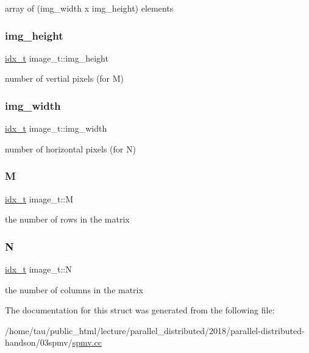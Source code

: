 array of (img\+\_\+width x img\+\_\+height) elements \mbox{\label{structimage__t_a37efb1b675fc28e5a131dca263fd2833}} 
\subsubsection{\texorpdfstring{img\+\_\+height}{img\_height}}
{\footnotesize\ttfamily \hyperlink{spmv_8cc_a8e93478a00e685bea5e6a3f617bf03a3}{idx\+\_\+t} image\+\_\+t\+::img\+\_\+height}

number of vertial pixels (for M) \mbox{\label{structimage__t_ae5f65c72e35caf8e730fe7962e732b0f}} 
\subsubsection{\texorpdfstring{img\+\_\+width}{img\_width}}
{\footnotesize\ttfamily \hyperlink{spmv_8cc_a8e93478a00e685bea5e6a3f617bf03a3}{idx\+\_\+t} image\+\_\+t\+::img\+\_\+width}

number of horizontal pixels (for N) \mbox{\label{structimage__t_a9ee57eb792a8c6bd1cd79efa329c728d}} 
\subsubsection{\texorpdfstring{M}{M}}
{\footnotesize\ttfamily \hyperlink{spmv_8cc_a8e93478a00e685bea5e6a3f617bf03a3}{idx\+\_\+t} image\+\_\+t\+::M}

the number of rows in the matrix \mbox{\label{structimage__t_ac6fdcfae13f4b5eccac7e9ef12502d64}} 
\subsubsection{\texorpdfstring{N}{N}}
{\footnotesize\ttfamily \hyperlink{spmv_8cc_a8e93478a00e685bea5e6a3f617bf03a3}{idx\+\_\+t} image\+\_\+t\+::N}

the number of columns in the matrix 

The documentation for this struct was generated from the following file\+:\begin{DoxyCompactItemize}
\item 
/home/tau/public\+\_\+html/lecture/parallel\+\_\+distributed/2018/parallel-\/distributed-\/handson/03spmv/\hyperlink{spmv_8cc}{spmv.\+cc}\end{DoxyCompactItemize}
